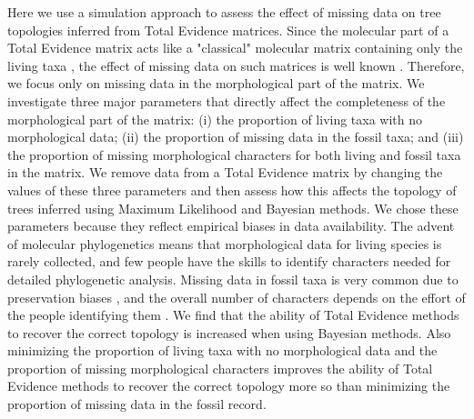 \documentclass[12pt,letterpaper]{article}
\begin{document}
Here we use a simulation approach to assess the effect of missing data on tree topologies inferred from Total Evidence matrices. Since the molecular part of a Total Evidence matrix acts like a "classical" molecular matrix containing only the living taxa \citep{ronquista2012}, the effect of missing data on such matrices is well known \citep{wiensmissing2006,wiensmissing2008,rouresite-specific2011}. Therefore, we focus only on missing data in the morphological part of the matrix. We investigate three major parameters that directly affect the completeness of the morphological part of the matrix: (i) the proportion of living taxa with no morphological data; (ii) the proportion of missing data in the fossil taxa; and (iii) the proportion of missing morphological characters for both living and fossil taxa in the matrix. We remove data from a Total Evidence matrix by changing the values of these three parameters and then assess how this affects the topology of trees inferred using Maximum Likelihood and Bayesian methods. We chose these parameters because they reflect empirical biases in data availability. The advent of molecular phylogenetics means that morphological data for living species is rarely collected, and few people have the skills to identify characters needed for detailed phylogenetic analysis. Missing data in fossil taxa is very common due to preservation biases \citep{sansomfossilization2013}, and the overall number of characters depends on the effort of the people identifying them \citep[e.g.][]{O'Leary08022013}. We find that the ability of Total Evidence methods to recover the correct topology is increased when using Bayesian methods. Also minimizing the proportion of living taxa with no morphological data and the proportion of missing morphological characters improves the ability of Total Evidence methods to recover the correct topology more so than minimizing the proportion of missing data in the fossil record.

%
%
 
\newpage
\end{document}
